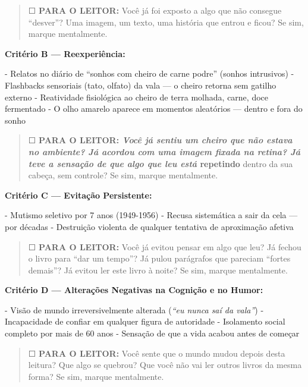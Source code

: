\begin{quote}
☐ \textbf{PARA O LEITOR:} Você já foi exposto a algo que não consegue \textquotedblleft{}desver\textquotedblright{}? Uma imagem, um texto, uma história que entrou e ficou? Se sim, marque mentalmente.
\end{quote}

\noindent \textbf{Critério B --- Reexperiência:}

\noindent - Relatos no diário de \textquotedblleft{}sonhos com cheiro de carne podre\textquotedblright{} (sonhos intrusivos)
- Flashbacks sensoriais (tato, olfato) da vala --- o cheiro retorna sem gatilho externo
- Reatividade fisiológica ao cheiro de terra molhada, carne, doce fermentado
- O olho amarelo aparece em momentos aleatórios --- dentro e fora do sonho

\begin{quote}
☐ \textbf{PARA O LEITOR:\textit{ Você já sentiu um cheiro que não estava no ambiente? Já acordou com uma imagem fixada na retina? Já teve a sensação de que algo que leu está }repetindo} dentro da sua cabeça, sem controle? Se sim, marque mentalmente.
\end{quote}

\noindent \textbf{Critério C --- Evitação Persistente:}

\noindent - Mutismo seletivo por 7 anos (1949-1956)
- Recusa sistemática a sair da cela --- por décadas
- Destruição violenta de qualquer tentativa de aproximação afetiva

\begin{quote}
☐ \textbf{PARA O LEITOR:} Você já evitou pensar em algo que leu? Já fechou o livro para \textquotedblleft{}dar um tempo\textquotedblright{}? Já pulou parágrafos que pareciam \textquotedblleft{}fortes demais\textquotedblright{}? Já evitou ler este livro à noite? Se sim, marque mentalmente.
\end{quote}

\noindent \textbf{Critério D --- Alterações Negativas na Cognição e no Humor:}

\noindent - Visão de mundo irreversivelmente alterada (\textit{\textquotedblleft{}eu nunca saí da vala\textquotedblright{}})
- Incapacidade de confiar em qualquer figura de autoridade
- Isolamento social completo por mais de 60 anos
- Sensação de que a vida acabou antes de começar

\begin{quote}
☐ \textbf{PARA O LEITOR:} Você sente que o mundo mudou depois desta leitura? Que algo se quebrou? Que você não vai ler outros livros da mesma forma? Se sim, marque mentalmente.
\end{quote}

